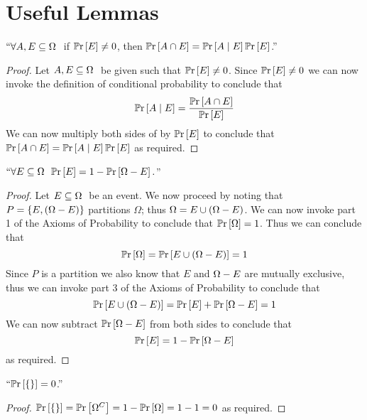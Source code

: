     \section{Useful Lemmas}
        \begin{lemma}
            $``\forall A, E \subseteq \Omega \ $ if $\mathbb{P}\mathrm{r} \left[E\right] \neq 0$, then
            $\mathbb{P}\mathrm{r} \left[A \cap E\right] = \mathbb{P}\mathrm{r}\left[A \mid E\right] \mathbb{P}\mathrm{r} \left[E\right]$.''
            \label{Conditional Probability Lemma}
        \end{lemma}
        \begin{proof}
            Let $A, E \subseteq \Omega \ $ be given such that $\mathbb{P}\mathrm{r} \left[E\right] \neq 0$.
            Since $\mathbb{P}\mathrm{r} \left[E\right] \neq 0$ we can now invoke the definition of conditional probability to
            conclude that
            \begin{equation}
                \mathbb{P}\mathrm{r}\left[A \mid E\right] = \frac{\mathbb{P}\mathrm{r} \left[A \cap E\right]}{\mathbb{P}\mathrm{r} \left[E\right]}
                \label{Conditional Probability Lemma equation 1}
            \end{equation}
            We can now multiply both sides of 
            by $\mathbb{P}\mathrm{r} \left[E\right]$ to conclude that $\mathbb{P}\mathrm{r} \left[A \cap E\right] = \mathbb{P}\mathrm{r}\left[A \mid E\right] \mathbb{P}\mathrm{r} \left[E\right]$ as
            required. \QED
        \end{proof}
        \begin{lemma}
            $``\forall E \subseteq \Omega \  \ \mathbb{P}\mathrm{r} \left[E\right] = 1 - \mathbb{P}\mathrm{r} \left[\Omega - E\right].$''
            \label{Complement Lemma}
        \end{lemma}
        \begin{proof}
            Let $E \subseteq \Omega \ $ be an event. We now proceed by noting that
            $P = \left\{E, \left(\Omega - E\right)\right\}$ partitions $\Omega$; thus
            $\Omega = E \cup \left(\Omega - E\right)$.
            We can now invoke part 1 of the Axioms of Probability to conclude that
            $\mathbb{P}\mathrm{r} \left[\Omega\right] = 1$. Thus we can conclude that 
            \[
                \mathbb{P}\mathrm{r} \left[\Omega\right] = \mathbb{P}\mathrm{r} \left[E \cup \left(\Omega - E\right)\right] = 1
            \]
            Since $P$ is a partition we also know that $E$ and $\Omega - E$ are
            mutually exclusive, thus we can invoke part 3 of the Axioms of Probability
            to conclude that
            \[
                \mathbb{P}\mathrm{r} \left[E \cup \left(\Omega - E\right)\right] = \mathbb{P}\mathrm{r} \left[E\right] + \mathbb{P}\mathrm{r} \left[\Omega - E\right] = 1
            \]
            We can now subtract $\mathbb{P}\mathrm{r} \left[\Omega - E\right]$ from both sides to conclude that
            \[
                \mathbb{P}\mathrm{r} \left[E\right] = 1 - \mathbb{P}\mathrm{r} \left[\Omega - E\right]
            \]
            as required. \QED
        \end{proof}
        \begin{corollary}
            $``\mathbb{P}\mathrm{r} \left[\left\{\right\}\right] = 0$.''
        \end{corollary}
        \begin{proof}
            $\mathbb{P}\mathrm{r} \left[\left\{\right\}\right] = \mathbb{P}\mathrm{r} \left[\Omega^{C}\right] = 1 - \mathbb{P}\mathrm{r} \left[\Omega\right] = 1 - 1 = 0$ as required. \QED
        \end{proof}
